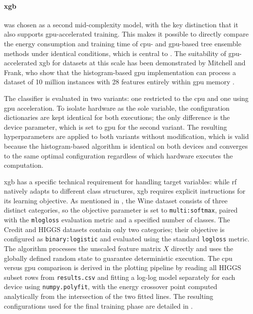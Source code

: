 \paragraph{\gls{xgb}} was chosen as a second mid-complexity model, with the key distinction that it also supports \gls{gpu}-accelerated training. This makes it possible to directly compare the energy consumption and training time of \gls{cpu}- and \gls{gpu}-based tree ensemble methods under identical conditions, which is central to . The suitability of \gls{gpu}-accelerated \gls{xgb} for datasets at this scale has been demonstrated by Mitchell and Frank, who show that the histogram-based \gls{gpu} implementation can process a dataset of 10 million instances with 28 features entirely within \gls{gpu} memory \cite{mitchellAcceleratingXGBoostAlgorithm2017}.


The classifier is evaluated in two variants: one restricted to the \gls{cpu} and one using \gls{gpu} acceleration. To isolate hardware as the sole variable, the configuration dictionaries are kept identical for both executions; the only difference is the device parameter, which is set to \gls{gpu} for the second variant. The resulting hyperparameters are applied to both variants without modification, which is valid because the histogram-based algorithm is identical on both devices and converges to the same optimal configuration regardless of which hardware executes the computation. 

\gls{xgb} has a specific technical requirement for handling target variables: while \gls{rf} natively adapts to different class structures, \gls{xgb} requires explicit instructions for its learning objective. As mentioned in , the Wine dataset consists of three distinct categories, so the objective parameter is set to \texttt{multi:softmax}, paired with the \texttt{mlogloss} evaluation metric and a specified number of classes. The Credit and HIGGS datasets contain only two categories; their objective is configured as \texttt{binary:logistic} and evaluated using the standard \texttt{logloss} metric. The algorithm processes the unscaled feature matrix $X$ directly and uses the globally defined random state to guarantee deterministic execution. The \gls{cpu} versus \gls{gpu} comparison is derived in the plotting pipeline by reading all HIGGS subset rows from \texttt{results.csv} and fitting a log-log model separately for each device using \texttt{numpy.polyfit}, with the energy crossover point computed analytically from the intersection of the two fitted lines. The resulting configurations used for the final training phase are detailed in .


